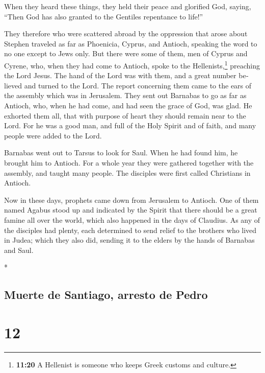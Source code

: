 \begin{paracol}{2}
\begin{otherlanguage}{english}
 When they heard these things, they held their peace and
glorified God, saying, ``Then God has also granted to the Gentiles
repentance to life!''

 They therefore who were scattered abroad by the
oppression that arose about Stephen traveled as far as Phoenicia,
Cyprus, and Antioch, speaking the word to no one except to Jews only.
 But there were some of them, men of Cyprus and Cyrene,
who, when they had come to Antioch, spoke to the Hellenists,\footnote{\textbf{11:20}
  A Hellenist is someone who keeps Greek customs and culture.} preaching
the Lord Jesus.  The hand of the Lord was with them, and
a great number believed and turned to the Lord.  The
report concerning them came to the ears of the assembly which was in
Jerusalem. They sent out Barnabas to go as far as Antioch,
 who, when he had come, and had seen the grace of God,
was glad. He exhorted them all, that with purpose of heart they should
remain near to the Lord.  For he was a good man, and full
of the Holy Spirit and of faith, and many people were added to the Lord.

 Barnabas went out to Tarsus to look for Saul.
 When he had found him, he brought him to Antioch. For a
whole year they were gathered together with the assembly, and taught
many people. The disciples were first called Christians in Antioch.

 Now in these days, prophets came down from Jerusalem to
Antioch.  One of them named Agabus stood up and indicated
by the Spirit that there should be a great famine all over the world,
which also happened in the days of Claudius.  As any of
the disciples had plenty, each determined to send relief to the brothers
who lived in Judea;  which they also did, sending it to
the elders by the hands of Barnabas and Saul.

\end{otherlanguage}

\switchcolumn[0]*

\hypertarget{muerte-de-santiago-arresto-de-pedro}{%
\subsection{Muerte de Santiago, arresto de
Pedro}\label{muerte-de-santiago-arresto-de-pedro}}

\hypertarget{section-22}{%
\section{12}\label{section-22}}


\end{paracol}
